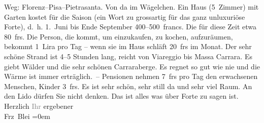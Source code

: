\begin{ledgroupsized}[t]{13cm}
               Weg: Florenz–Pisa–Pietrasanta. Von da im Wägelchen.
               Ein Haus (5 Zimmer) mit Garten kostet für die Saison (ein Wort zu grossartig für das
               ganz unluxuriöse Forte), d. h.
                  1. Juni bis Ende September 400–500 francs. Die \label{K_L01998_3v}\label{K_L01998_3h} für diese Zeit etwa 80 frs.
               Die Person, die kommt, um einzukaufen, zu kochen, aufzuräumen, bekommt 1 Lira pro Tag
               – wenn sie im Haus schläft 20 frs im Monat. {\pb}Der sehr schöne Strand ist 4–5 Stunden
               lang, reicht von Viareggio bis Massa Carrara. Es giebt Wälder und die sehr schönen Carraraberge. Es regnet so gut wie nie und die Wärme
               ist immer erträglich. –\pend
           \pstart
           Pensionen nehmen 7 frs pro Tag den erwachsenen Menschen, Kinder 3 frs.\pend
           \pstart
           Es ist sehr schön, sehr still da und sehr viel Raum. An den Lido dürfen Sie nicht denken.\pend
           \pstart
           Das ist alles was über Forte zu sagen ist.\pend
           \pstart
           Herzlich \textcolor{gray}{Ihr} ergebener{\\[\baselineskip]}\spacefill\mbox{Frz Blei}\pend
           \leftskip=0em{}\endnumbering{}\end{ledgroupsized}  \newcommand{\dateiname}{L01998}\newcommand{\titel}{Franz Blei an Arthur Schnitzler, [Anfang? Januar 1911]}\newcommand{\editorInnen}{Martin Anton Müller und Gerd-Hermann Susen}
      